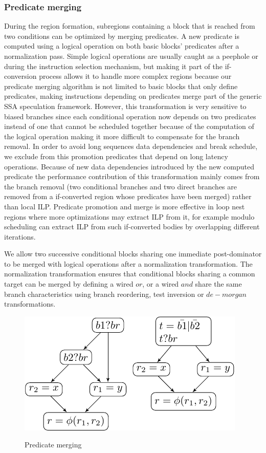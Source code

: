 \subsubsection{Predicate merging}

During the region formation, subregions containing a block that is reached from two conditions can be optimized by merging predicates. A new predicate is computed using a logical operation on both basic blocks' predicates after a normalization pass. Simple logical operations are usually caught as a peephole or during the instruction selection mechanism, but making it part of the if-conversion process allows it to handle more complex regions because our predicate merging algorithm is not limited to basic blocks that only define predicates, making instructions depending on predicates merge part of the generic SSA speculation framework. However, this transformation is very sensitive to biased branches since each conditional operation now depends on two predicates instead of one that cannot be scheduled together because of the computation of the logical operation making it more difficult to compensate for the branch removal. In order to avoid long sequences data dependencies and break schedule, we exclude from this promotion predicates that depend on long latency operations.
Because of new data dependencies introduced by the new computed predicate the performance contribution of this transformation mainly comes from the branch removal (two conditional branches and two direct branches are removed from a if-converted region whose predicates have been merged) rather than local ILP. Predicate promotion and merge is more effective in loop nest regions where more optimizations may extract ILP from it, for example modulo scheduling can extract ILP from such if-converted bodies by overlapping different iterations. 

We allow two successive conditional blocks sharing one immediate post-dominator to be merged with logical operations after a normalization transformation. The normalization transformation ensures that conditional blocks sharing a common target can be merged by defining a wired $or$, or a wired $and$ share the same branch characteristics using branch reordering, test inversion or $de-morgan$ transformations.

\begin{figure}
  \includegraphics[scale=0.8]{phi_merge}
  \label{fig:phi_merge}
\caption{Predicate merging}
\end{figure}

